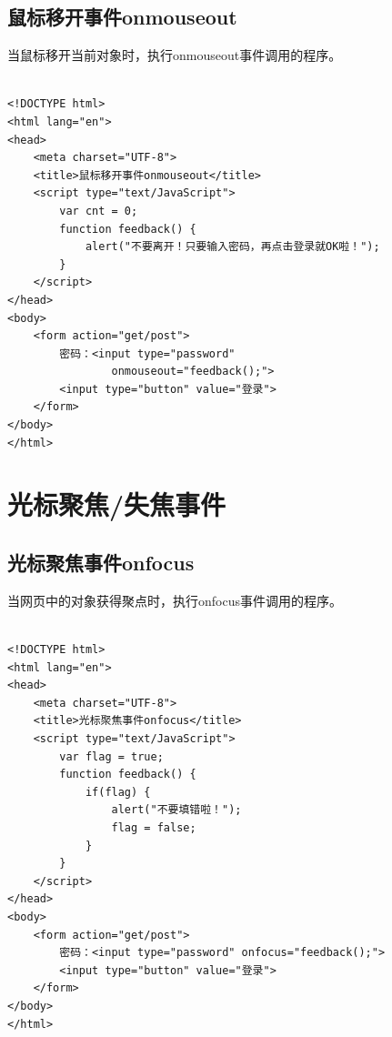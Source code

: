 \vspace{0.5cm}

\subsection{鼠标移开事件onmouseout}

当鼠标移开当前对象时，执行onmouseout事件调用的程序。\\

\\

\begin{lstlisting}[style=htmlcssjs]
<!DOCTYPE html>
<html lang="en">
<head>
    <meta charset="UTF-8">
    <title>鼠标移开事件onmouseout</title>
    <script type="text/JavaScript">
        var cnt = 0;
        function feedback() {
            alert("不要离开！只要输入密码，再点击登录就OK啦！");
        }
    </script>
</head>
<body>
    <form action="get/post">
        密码：<input type="password"
                onmouseout="feedback();">
        <input type="button" value="登录">
    </form>
</body>
</html>
\end{lstlisting}

\newpage

\section{光标聚焦/失焦事件}

\subsection{光标聚焦事件onfocus}

当网页中的对象获得聚点时，执行onfocus事件调用的程序。\\

\\

\begin{lstlisting}[style=htmlcssjs]
<!DOCTYPE html>
<html lang="en">
<head>
    <meta charset="UTF-8">
    <title>光标聚焦事件onfocus</title>
    <script type="text/JavaScript">
        var flag = true;
        function feedback() {
            if(flag) {
                alert("不要填错啦！");
                flag = false;
            }
        }
    </script>
</head>
<body>
    <form action="get/post">
        密码：<input type="password" onfocus="feedback();">
        <input type="button" value="登录">
    </form>
</body>
</html>
\end{lstlisting}

